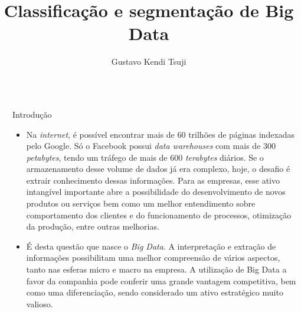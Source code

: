 \documentclass[final,hyperref={pdfpagelabels=false}]{beamer}
\title{\huge Classifica\c c\~ao e segmenta\c c\~ao de Big Data} %
\author{Gustavo Kendi Tsuji} %
\institute{Faculdade de Administra\c c\~ao, Economia e Contabilidade} %
\begin{document}

\begin{frame}[t] %

\begin{columns}[t] %

\begin{column}{.02\textwidth}\end{column} %

\begin{column}{.465\textwidth} %

            
\begin{block}{Introdu\c c\~ao}

\begin{itemize}

\item Na \emph{internet}, é possível encontrar mais de 60 trilhões de páginas indexadas pelo Google. Só o Facebook possui \emph{data warehouses} com mais de 300 \emph{petabytes}, tendo um tráfego de mais de 600 \emph{terabytes} diários. Se o armazenamento desse volume de dados já era complexo, hoje, o desafio é extrair conhecimento dessas informações. Para as empresas, esse ativo intangível importante abre a possibilidade do desenvolvimento de novos produtos ou serviços bem como um melhor entendimento sobre comportamento dos clientes e do funcionamento de processos, otimização da produção, entre outras melhorias.

\item É desta questão que  nasce o \emph{Big Data}. A interpretação e extração de informações possibilitam uma melhor compreensão de vários aspectos, tanto nas esferas micro e macro na empresa. A utilização de \alert{Big Data} a favor da companhia pode conferir uma grande vantagem competitiva, bem como uma diferenciação, sendo considerado um ativo estratégico muito valioso.

\end{itemize}


\end{block}
\end{column}
\end{columns}
\end{frame}
\end{document}
